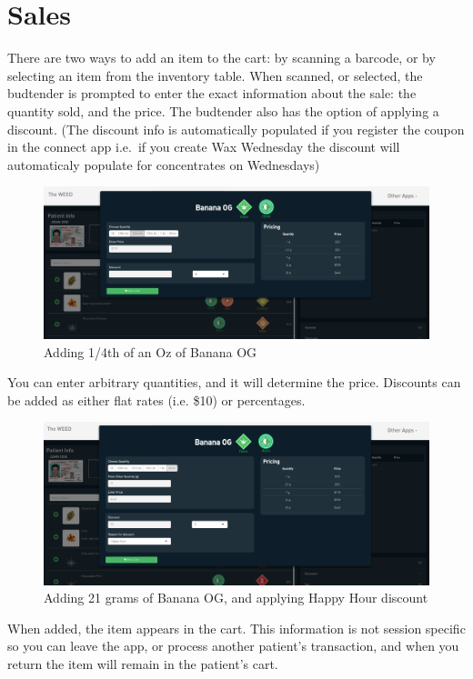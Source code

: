 \documentclass[]{book}
\theoremstyle{definition}
\theoremstyle{definition}
\theoremstyle{definition}
\theoremstyle{remark}
\begin{document}
\section{Sales}\label{sales}

There are two ways to add an item to the cart: by scanning a barcode, or
by selecting an item from the inventory table. When scanned, or
selected, the budtender is prompted to enter the exact information about
the sale: the quantity sold, and the price. The budtender also has the
option of applying a discount. (The discount info is automatically
populated if you register the coupon in the connect app i.e.~if you
create Wax Wednesday the discount will automaticaly populate for
concentrates on Wednesdays)

\begin{figure}
\centering
\includegraphics{images/P5.png}
\caption{Adding 1/4th of an Oz of Banana OG}
\end{figure}

You can enter arbitrary quantities, and it will determine the price.
Discounts can be added as either flat rates (i.e. \$10) or percentages.

\begin{figure}
\centering
\includegraphics{images/P6.png}
\caption{Adding 21 grams of Banana OG, and applying Happy Hour discount}
\end{figure}

When added, the item appears in the cart. This information is not
session specific so you can leave the app, or process another patient's
transaction, and when you return the item will remain in the patient's
cart.
\end{document}

